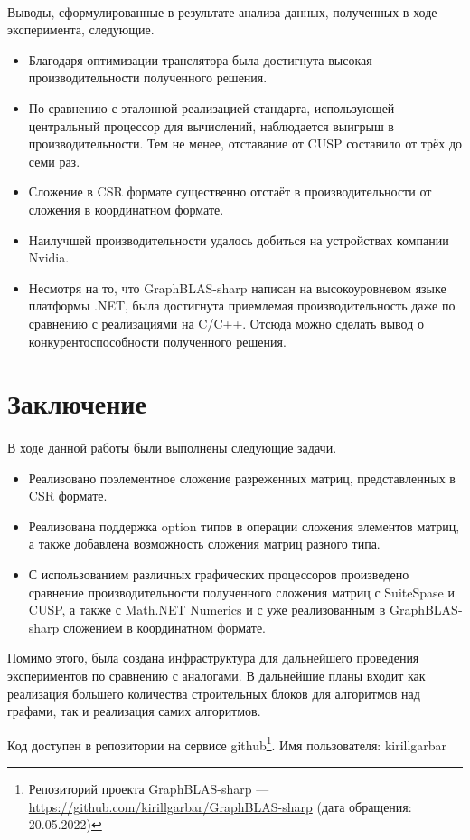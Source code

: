 \documentclass[14pt]{matmex-diploma-custom}
\begin{document}
\paragraph{}Выводы, сформулированные в результате анализа данных, полученных в ходе эксперимента, следующие.
\begin{itemize}
    \item Благодаря оптимизации транслятора была достигнута высокая производительности полученного решения.
    \item По сравнению с эталонной реализацией стандарта, использующей центральный процессор для вычислений, наблюдается выигрыш в производительности. Тем не менее, отставание от CUSP составило от трёх до семи раз.
    \item Сложение в CSR формате существенно отстаёт в производительности от сложения в координатном формате.
    \item Наилучшей производительности удалось добиться на устройствах компании Nvidia.
    \item Несмотря на то, что GraphBLAS-sharp написан на высокоуровневом языке платформы .NET, была достигнута приемлемая производительность даже по сравнению с реализациями на C/C++. Отсюда можно сделать вывод о конкурентоспособности полученного решения.
\end{itemize}

\section*{Заключение}
\paragraph{}В ходе данной работы были выполнены следующие задачи.
\begin{itemize}
    \item Реализовано поэлементное сложение разреженных матриц, представленных в CSR формате.
    \item Реализована поддержка option типов в операции сложения элементов матриц, а также добавлена возможность сложения матриц разного типа.
    \item С использованием различных графических процессоров произведено сравнение производительности полученного сложения матриц с SuiteSpase и CUSP, а также с Math.NET Numerics и с уже реализованным в GraphBLAS-sharp сложением в координатном формате.
\end{itemize}

Помимо этого, была создана инфраструктура для дальнейшего проведения экспериментов по сравнению с аналогами. В дальнейшие планы входит как реализация большего количества строительных блоков для алгоритмов над графами, так и реализация самих алгоритмов.

Код доступен в репозитории на сервисе github\footnote{Репозиторий проекта GraphBLAS-sharp --- \url{https://github.com/kirillgarbar/GraphBLAS-sharp} (дата обращения: 20.05.2022)}.
Имя пользователя: kirillgarbar



\end{document}
